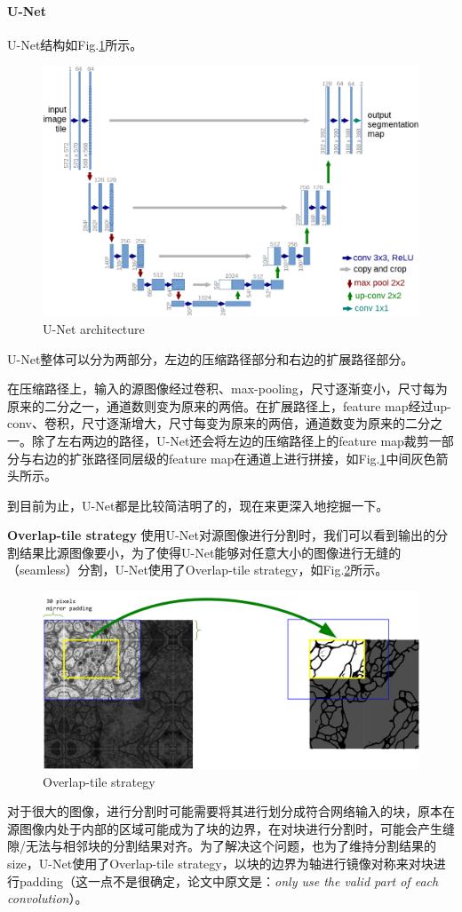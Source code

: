 \paragraph{U-Net}
U-Net结构如Fig.\ref{fig:unet}所示。
\begin{figure}[h]
	\centering
	\includegraphics[width=.8\textwidth]{pics/unet.png}
	\caption{U-Net architecture}
	\label{fig:unet}
\end{figure}
U-Net整体可以分为两部分，左边的压缩路径部分和右边的扩展路径部分。

在压缩路径上，输入的源图像经过卷积、max-pooling，尺寸逐渐变小，尺寸每为原来的二分之一，通道数则变为原来的两倍。在扩展路径上，feature map经过up-conv、卷积，尺寸逐渐增大，尺寸每变为原来的两倍，通道数变为原来的二分之一。除了左右两边的路径，U-Net还会将左边的压缩路径上的feature map裁剪一部分与右边的扩张路径同层级的feature map在通道上进行拼接，如Fig.\ref{fig:unet}中间灰色箭头所示。

到目前为止，U-Net都是比较简洁明了的，现在来更深入地挖掘一下。

\par{\textbf{Overlap-tile strategy}} 使用U-Net对源图像进行分割时，我们可以看到输出的分割结果比源图像要小，为了使得U-Net能够对任意大小的图像进行无缝的（seamless）分割，U-Net使用了Overlap-tile strategy，如Fig.\ref{fig:overlap-tile}所示。
\begin{figure}[h]
	\centering
	\includegraphics[width=.8\textwidth]{pics/Overlap-tile strategy.png}
	\caption{Overlap-tile strategy}
	\label{fig:overlap-tile}
\end{figure}
对于很大的图像，进行分割时可能需要将其进行划分成符合网络输入的块，原本在源图像内处于内部的区域可能成为了块的边界，在对块进行分割时，可能会产生缝隙/无法与相邻块的分割结果对齐。为了解决这个问题，也为了维持分割结果的size，U-Net使用了Overlap-tile strategy，以块的边界为轴进行镜像对称来对块进行padding（这一点不是很确定，论文中原文是：\textit{only use the valid part of each convolution}）。

